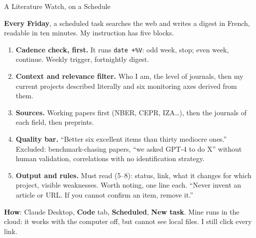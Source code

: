 \documentclass[svgnames,x11names,dvipsnames]{beamer}
\newcommand{\chg}[1]{{\bfseries #1}}
\renewcommand{\chg}[1]{#1}
\begin{document}
\begin{frame}{\chg{A Literature Watch, on a Schedule}}

\footnotesize
\chg{\textbf{Every Friday}, a scheduled task searches the web and writes a digest in French, readable in ten minutes. My instruction has five blocks.}

\vspace{0.15cm}

\begin{enumerate}
    \setlength{\itemsep}{2pt}
    \item \textbf{\chg{Cadence check, first.}} \chg{It runs \texttt{date +\%V}: odd week, stop; even week, continue. Weekly trigger, fortnightly digest.}
    \item \textbf{\chg{Context and relevance filter.}} \chg{Who I am, the level of journals, then my current projects described literally and six monitoring axes derived from them.}
    \item \textbf{\chg{Sources.}} \chg{Working papers first (NBER, CEPR, IZA\ldots), then the journals of each field, then preprints.}
    \item \textbf{\chg{Quality bar.}} \chg{``Better six excellent items than thirty mediocre ones.'' Excluded: benchmark-chasing papers, ``we asked GPT-4 to do X'' without human validation, correlations with no identification strategy.}
    \item \textbf{\chg{Output and rules.}} \chg{Must read (5--8): status, link, what it changes for which project, visible weaknesses. Worth noting, one line each. ``Never invent an article or URL. If you cannot confirm an item, remove it.''}
\end{enumerate}

\vspace{0.15cm}

\textbf{\chg{How}}\chg{: Claude Desktop, \textbf{Code} tab, \textbf{Scheduled}, \textbf{New task}. Mine runs in the cloud: it works with the computer off, but cannot see local files. I still click every link.}

\end{frame}
\end{document}
